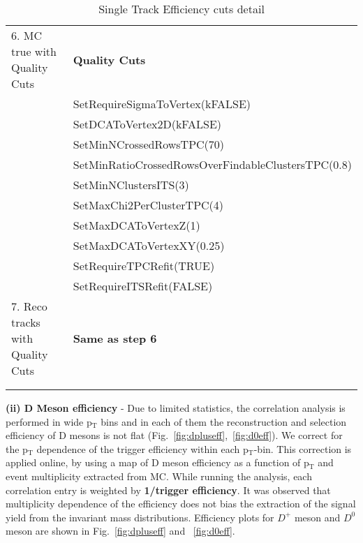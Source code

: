 \begin{table}[h]
\begin{tabular}{  p{5cm} |  p{8.5cm} }
6. MC true with Quality Cuts         &      			      {\textbf  {Quality Cuts }} \\
																	&SetRequireSigmaToVertex(kFALSE) \\
																	&SetDCAToVertex2D(kFALSE) \\
																	&SetMinNCrossedRowsTPC(70)\\
																	&SetMinRatioCrossedRowsOverFindableClustersTPC(0.8)\\
																	&SetMinNClustersITS(3)\\
																	&SetMaxChi2PerClusterTPC(4)\\
																	&SetMaxDCAToVertexZ(1) \\
																	&SetMaxDCAToVertexXY(0.25) \\
																	&SetRequireTPCRefit(TRUE) \\
																	&SetRequireITSRefit(FALSE) \\

7. Reco tracks with Quality Cuts         &             {\textbf  {Same as step 6}} \\

 &\\		            	            		

 \hline \hline
 \\
\end{tabular}
\caption{\large {Single Track Efficiency cuts detail}} %
\label{table:effCuts}	
\end{table}


{\bf \large (ii) D Meson efficiency} - Due to limited statistics, the correlation analysis is performed in wide p$_\mathrm{T}$ bins and in each of them the reconstruction and selection efficiency of D mesons is not flat (Fig.~\ref{fig:dpluseff},~\ref{fig:d0eff}). We correct for the p$_\mathrm{T}$ dependence of the trigger efficiency within each p$_\mathrm{T}$-bin.
This correction is applied online, by using a map of D meson efficiency as a function of p$_\mathrm{T}$ and event multiplicity extracted from MC.
While running the analysis, each correlation entry is weighted by {\bf 1/trigger efficiency}. It was observed that multiplicity dependence of the efficiency does not bias the extraction of the signal yield from the invariant mass distributions. Efficiency plots for $D^{+}$ meson and $D^{0}$ meson are shown in Fig.~\ref{fig:dpluseff} and ~\ref{fig:d0eff}.

